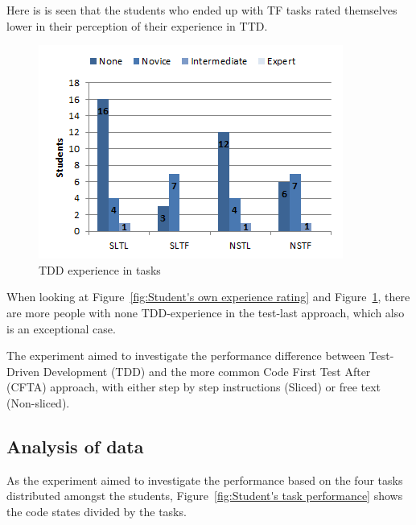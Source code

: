 \documentclass{sig-alternate-05-2015}
\begin{document}
Here is is seen that the students who ended up with TF tasks rated themselves lower in their perception of their experience in TTD.

\begin{figure}[!ht]
	\centering
	\includegraphics[width=1\linewidth]{img04}
	\caption{TDD experience in tasks}
	\label{fig:TDD experience in tasks}
\end{figure}

When looking at Figure~\ref{fig:Student's own experience rating} and Figure~\ref{fig:TDD experience in tasks}, there are more people with none TDD-experience in the test-last approach, which also is an exceptional case.

The experiment aimed to investigate the performance difference between Test-Driven Development (TDD) and the more common Code First Test After (CFTA) approach, with either step by step instructions (Sliced) or free text (Non-sliced).\\

\subsection{Analysis of data} %
As the experiment aimed to investigate the performance based on the four tasks distributed amongst the students, Figure~\ref{fig:Student's task performance} shows the code states divided by the tasks.
\end{document}
